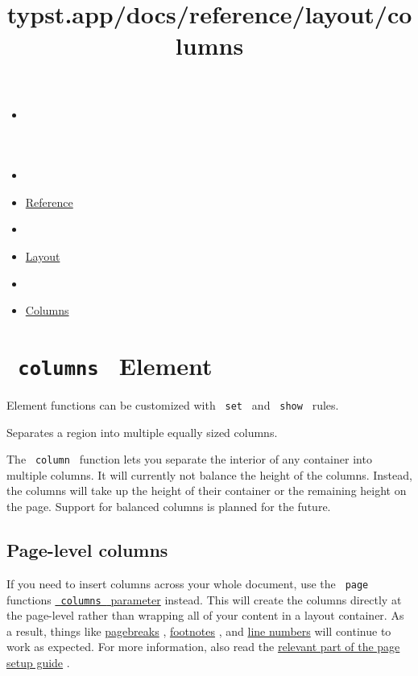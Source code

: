 \title{typst.app/docs/reference/layout/columns}

\begin{itemize}
\tightlist
\item
  \href{/docs}{}
\item
  
\item
  \href{/docs/reference/}{Reference}
\item
  
\item
  \href{/docs/reference/layout/}{Layout}
\item
  
\item
  \href{/docs/reference/layout/columns/}{Columns}
\end{itemize}

\section{\texorpdfstring{\texttt{\ columns\ } {{ Element
}}}{ columns   Element }}\label{summary}

\label{element-tooltip}
Element functions can be customized with \texttt{\ set\ } and
\texttt{\ show\ } rules.

Separates a region into multiple equally sized columns.

The \texttt{\ column\ } function lets you separate the interior of any
container into multiple columns. It will currently not balance the
height of the columns. Instead, the columns will take up the height of
their container or the remaining height on the page. Support for
balanced columns is planned for the future.

\subsection{Page-level columns}\label{page-level}

If you need to insert columns across your whole document, use the
\texttt{\ page\ } function\textquotesingle s
\href{/docs/reference/layout/page/\#parameters-columns}{\texttt{\ columns\ }
parameter} instead. This will create the columns directly at the
page-level rather than wrapping all of your content in a layout
container. As a result, things like
\href{/docs/reference/layout/pagebreak/}{pagebreaks} ,
\href{/docs/reference/model/footnote/}{footnotes} , and
\href{/docs/reference/model/par/\#definitions-line}{line numbers} will
continue to work as expected. For more information, also read the
\href{/docs/guides/page-setup-guide/\#columns}{relevant part of the page
setup guide} .

